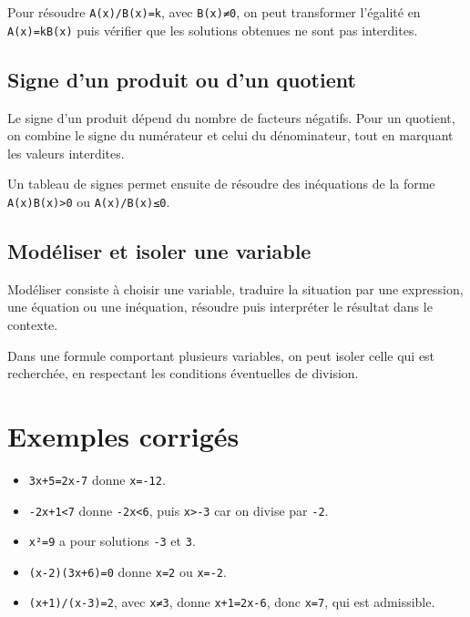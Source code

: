 Pour résoudre \texttt{A(x)/B(x)=k}, avec \texttt{B(x)≠0}, on peut transformer l'égalité en \texttt{A(x)=kB(x)} puis vérifier que les solutions obtenues ne sont pas interdites.

\subsection{Signe d'un produit ou d'un quotient}

Le signe d'un produit dépend du nombre de facteurs négatifs. Pour un quotient, on combine le signe du numérateur et celui du dénominateur, tout en marquant les valeurs interdites.

Un tableau de signes permet ensuite de résoudre des inéquations de la forme \texttt{A(x)B(x)>0} ou \texttt{A(x)/B(x)≤0}.

\subsection{Modéliser et isoler une variable}

Modéliser consiste à choisir une variable, traduire la situation par une expression, une équation ou une inéquation, résoudre puis interpréter le résultat dans le contexte.

Dans une formule comportant plusieurs variables, on peut isoler celle qui est recherchée, en respectant les conditions éventuelles de division.

\section{Exemples corrigés}

\begin{itemize}
\item \texttt{3x+5=2x-7} donne \texttt{x=-12}.
\item \texttt{-2x+1<7} donne \texttt{-2x<6}, puis \texttt{x>-3} car on divise par \texttt{-2}.
\item \texttt{x²=9} a pour solutions \texttt{-3} et \texttt{3}.
\item \texttt{(x-2)(3x+6)=0} donne \texttt{x=2} ou \texttt{x=-2}.
\item \texttt{(x+1)/(x-3)=2}, avec \texttt{x≠3}, donne \texttt{x+1=2x-6}, donc \texttt{x=7}, qui est admissible.
\end{itemize}


